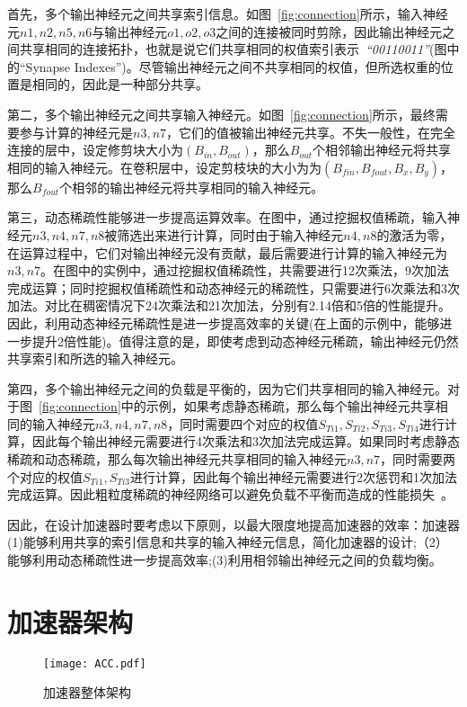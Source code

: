 首先，多个输出神经元之间共享索引信息。如图~\ref{fig:connection}所示，输入神经元$n1, n2, n5, n6$与输出神经元$o1, o2, o3$之间的连接被同时剪除，因此输出神经元之间共享相同的连接拓扑，也就是说它们共享相同的权值索引表示~\emph{“00110011”}(图中的“Synapse Indexes”)。尽管输出神经元之间不共享相同的权值，但所选权重的位置是相同的，因此是一种部分共享。

第二，多个输出神经元之间共享输入神经元。如图~\ref{fig:connection}所示，最终需要参与计算的神经元是$n3, n7$，它们的值被输出神经元共享。不失一般性，在完全连接的层中，设定修剪块大小为$(B_{in},B_{out})$，那么$B_{out}$个相邻输出神经元将共享相同的输入神经元。在卷积层中，设定剪枝块的大小为为$(B_{fin},B_{fout},B_x,B_y)$，那么$B_{fout}$个相邻的输出神经元将共享相同的输入神经元。

第三，动态稀疏性能够进一步提高运算效率。在图中，通过挖掘权值稀疏，输入神经元$n3, n4, n7, n8$被筛选出来进行计算，同时由于输入神经元$n4, n8$的激活为零，在运算过程中，它们对输出神经元没有贡献，最后需要进行计算的输入神经元为$n3, n7$。在图中的实例中，通过挖掘权值稀疏性，共需要进行12次乘法，9次加法完成运算；同时挖掘权值稀疏性和动态神经元的稀疏性，只需要进行6次乘法和3次加法。对比在稠密情况下24次乘法和21次加法，分别有2.14倍和5倍的性能提升。因此，利用动态神经元稀疏性是进一步提高效率的关键(在上面的示例中，能够进一步提升2倍性能)。值得注意的是，即使考虑到动态神经元稀疏，输出神经元仍然共享索引和所选的输入神经元。

第四，多个输出神经元之间的负载是平衡的，因为它们共享相同的输入神经元。对于图~\ref{fig:connection}中的示例，如果考虑静态稀疏，那么每个输出神经元共享相同的输入神经元$n3, n4, n7, n8$，同时需要四个对应的权值$S_{Ti1}, S_{Ti2}, S_{Ti3}, S_{Ti4}$进行计算，因此每个输出神经元需要进行4次乘法和3次加法完成运算。如果同时考虑静态稀疏和动态稀疏，那么每次输出神经元共享相同的输入神经元$n3, n7$，同时需要两个对应的权值$S_{Ti1}, S_{Ti3}$进行计算，因此每个输出神经元需要进行2次惩罚和1次加法完成运算。因此粗粒度稀疏的神经网络可以避免负载不平衡而造成的性能损失~\cite{han2017ese}。

因此，在设计加速器时要考虑以下原则，以最大限度地提高加速器的效率：加速器(1)能够利用共享的索引信息和共享的输入神经元信息，简化加速器的设计;（2）能够利用动态稀疏性进一步提高效率;(3)利用相邻输出神经元之间的负载均衡。


\section{加速器架构}
\begin{figure}[h]
\centering
\texttt{[image: ACC.pdf]}
\caption{加速器整体架构}
\label{fig:acc}
\end{figure}


